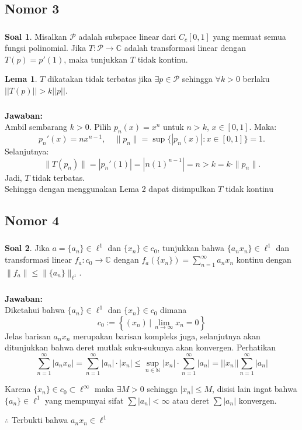 \documentclass[aspectratio=169]{beamer}
\theoremstyle{definition}
\newtheorem{lema}{Lema}
\newtheorem{soal}{Soal}
\newcommand{\N}{\mathbb{N}}
\begin{document}
\subsection{Nomor 3}
\begin{frame}
  \frametitle{\insertsection}
  \begin{soal}
    Misalkan $\mathcal{P}$ adalah subspace linear dari $C_c[0,1]$ yang memuat semua fungsi polinomial. Jika $T \colon \mathcal{P} \to \mathbb{C}$ adalah transformasi linear dengan $T(p) = p'(1)$, maka tunjukkan $T$ tidak kontinu.  \end{soal}
  \begin{lema}
    $T$ dikatakan tidak terbatas jika $\exists p\in \mathcal{P}$ sehingga $\forall k>0$ berlaku $||T(p)||>k||p||$.
  \end{lema}
\end{frame}
\begin{frame}
  \frametitle{\insertsection}
  \framesubtitle{\insertsubsection}
  \textbf{Jawaban:}\\
  Ambil sembarang $k > 0$. Pilih $p_n(x) = x^n$ untuk $n > k$, $x \in [0,1]$. Maka:
\[
p_n'(x) = nx^{n-1}, \quad \|p_n\| = \sup\{|p_n(x)| : x \in [0,1]\} = 1.
\]
Selanjutnya:
\[
\|T(p_n)\| = |p_n'(1)| = |n(1)^{n-1}| = n > k = k \cdot \|p_n\|.
\]
Jadi, $T$ tidak terbatas.\\

Sehingga dengan menggunakan Lema 2 dapat disimpulkan $T$ tidak kontinu
\end{frame}

\subsection{Nomor 4}
\begin{frame}
  \frametitle{\insertsection}
  \begin{soal}
    Jika $a = \{a_n\} \in \ell^1$ dan $\{x_n\} \in c_0$, tunjukkan bahwa $\{a_n x_n\} \in \ell^1$ dan transformasi linear $f_a \colon c_0 \to \mathbb{C}$ dengan $f_a(\{x_n\}) = \sum_{n=1}^\infty a_n x_n$ kontinu dengan $\|f_a\| \leq \|\{a_n\}\|_{\ell^1}$.
  \end{soal}
\end{frame}

\begin{frame}
  \frametitle{\insertsection}
  \framesubtitle{\insertsubsection}
  \textbf{Jawaban:}\\
  Diketahui bahwa $\{a_n\} \in \ell^1$ dan $\{x_n\} \in c_0$ dimana
    \[c_0:=\left\{(x_n)\,|\,\lim_{n \to \infty} x_n = 0\right\}\]
    Jelas barisan $a_nx_n$ merupakan barisan kompleks juga, selanjutnya akan ditunjukkan bahwa deret mutlak suku-sukunya akan konvergen. Perhatikan
    $$
\sum_{n=1}^\infty |a_n x_n| = \sum_{n=1}^\infty |a_n|\cdot|x_n| \leq \sup_{n\in\N} |x_n| \cdot \sum_{n=1}^\infty |a_n|=||x_n||\sum_{n=1}^\infty |a_n|
$$

Karena $\{x_n\} \in c_0 \subset \ell^\infty$ maka $\exists M > 0$ sehingga $|x_n| \leq M$, disisi lain ingat bahwa $\{a_n\} \in \ell^1$ yang mempunyai sifat $\sum |a_n| < \infty$ atau deret $\sum |a_n|$ konvergen.

$\therefore$ Terbukti bahwa $a_nx_n\in\ell^1$
\end{frame}
\end{document}
